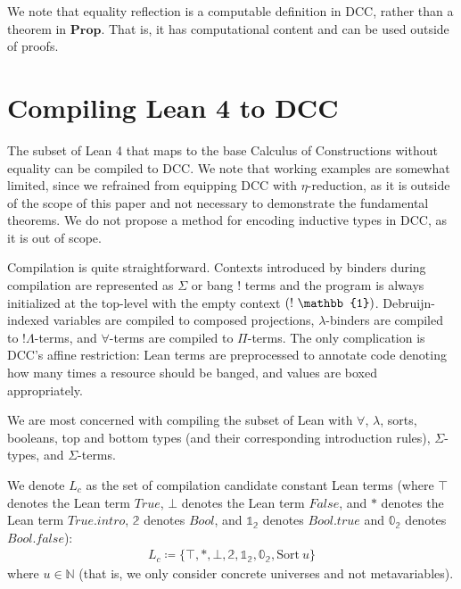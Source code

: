 \documentclass{lmcs}
\newcommand{\sort}[1]{\text{Sort}\ #1}
\begin{document}
We note that equality reflection is a computable definition in DCC, rather than a theorem in \(\textbf{Prop}\). That is, it has computational content and can be used outside of proofs.

\section{Compiling Lean 4 to DCC}\label{compilelean}

The subset of Lean 4 that maps to the base Calculus of Constructions without equality can be compiled to DCC. We note that working examples are somewhat limited, since we refrained from equipping DCC with \(\eta\)-reduction, as it is outside of the scope of this paper and not necessary to demonstrate the fundamental theorems. We do not propose a method for encoding inductive types in DCC, as it is out of scope.

Compilation is quite straightforward. Contexts introduced by binders during compilation are represented as \(\Sigma\) or bang \(!\) terms and the program is always initialized at the top-level with the empty context \(\comb[!][\mathbb{1}]\). Debruijn-indexed variables are compiled to composed projections, \(\lambda\)-binders are compiled to \(!\Lambda\)-terms, and \(\forall\)-terms are compiled to \(\Pi\)-terms. The only complication is DCC's affine restriction: Lean terms are preprocessed to annotate code denoting how many times a resource should be banged, and values are boxed appropriately.

We are most concerned with compiling the subset of Lean with \(\forall\), \(\lambda\), sorts, booleans, top and bottom types (and their corresponding introduction rules), \(\Sigma\)-types, and \(\Sigma\)-terms.

\begin{defi}
  We denote \(L_c\) as the set of compilation candidate constant Lean terms (where \(\top\) denotes the Lean term \(True\), \(\bot\) denotes the Lean term \(False\), and \(\ast\) denotes the Lean term \(True.intro\), \(\mathbb{2}\) denotes \(Bool\), and \(\mathbb{1}_{\mathbb{2}}\) denotes \(Bool.true\) and \(\mathbb{0}_{\mathbb{2}}\) denotes \(Bool.false\)):
  \[
    \begin{aligned}
      L_c \coloneq \{ \top, \ast, \bot, \mathbb{2}, \mathbb{1}_\mathbb{2}, \mathbb{0}_\mathbb{2}, \sort{u} \}
    \end{aligned}
  \]
  where \(u \in \mathbb{N}\) (that is, we only consider concrete universes and not metavariables).
\end{defi}
\end{document}
